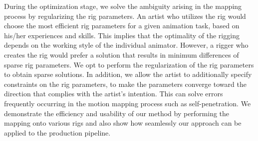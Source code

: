 During the optimization stage, we solve the ambiguity arising in the mapping process by regularizing the rig parameters. An artist who utilizes the rig would choose the most efficient rig parameters for a given animation task, based on his/her experiences and skills. This implies that the optimality of the rigging depends on the working style of the individual animator. However, a rigger who creates the rig would prefer a solution that results in minimum differences of sparse rig parameters. We opt to perform the regularization of the rig parameters to obtain sparse solutions. In addition, we allow the artist to additionally specify constraints on the rig parameters, to make the parameters converge toward the direction that complies with the artist's intention. This can solve errors frequently occurring in the motion mapping process such as self-penetration. We demonstrate the efficiency and usability of our method by performing the mapping onto various rigs and also show how seamlessly our approach can be applied to the production pipeline.




